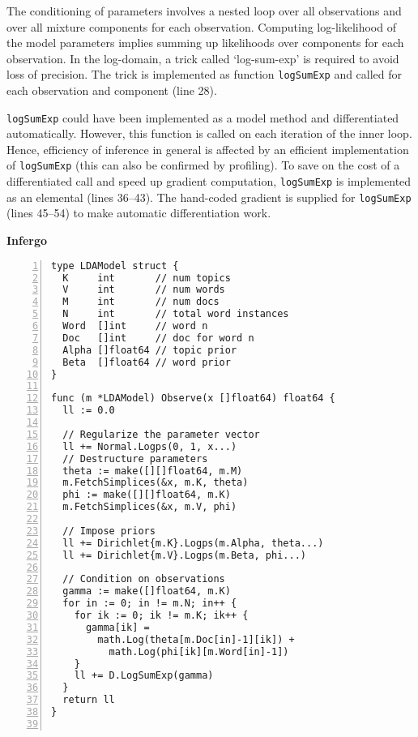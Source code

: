 \documentclass[sigplan,screen]{acmart}
\begin{document}
\begin{sloppypar}
The conditioning of parameters involves a nested loop over all
observations and over all mixture components for each
observation.  Computing log-likelihood of the model parameters
implies summing up likelihoods over components for each
observation.  In the log-domain, a trick called `log-sum-exp' is
required to avoid loss of precision. The trick is implemented
as function \lstinline{logSumExp} and called for each
observation and component (line 28).

\lstinline{logSumExp} could have been implemented as a model
method and differentiated automatically. However, this function
is called on each iteration of the inner loop. Hence,
efficiency of inference in general is affected by
an efficient implementation of \lstinline{logSumExp} (this can
also be confirmed by profiling). To save on the cost of a
differentiated call and speed up gradient computation,
\lstinline{logSumExp} is implemented as an elemental (lines
36--43). The hand-coded gradient is supplied for
\lstinline{logSumExp} (lines 45--54) to make automatic
differentiation work.

\begin{figure*}
\begin{minipage}[t]{0.49\textwidth}
\centering
\textbf{Infergo}

\begin{lstlisting}[xleftmargin=11pt,framexleftmargin=10pt,numbers=left]
type LDAModel struct {
  K     int       // num topics
  V     int       // num words
  M     int       // num docs
  N     int       // total word instances
  Word  []int     // word n
  Doc   []int     // doc for word n
  Alpha []float64 // topic prior
  Beta  []float64 // word prior
}

func (m *LDAModel) Observe(x []float64) float64 {
  ll := 0.0

  // Regularize the parameter vector
  ll += Normal.Logps(0, 1, x...)
  // Destructure parameters
  theta := make([][]float64, m.M)
  m.FetchSimplices(&x, m.K, theta)
  phi := make([][]float64, m.K)
  m.FetchSimplices(&x, m.V, phi)

  // Impose priors
  ll += Dirichlet{m.K}.Logps(m.Alpha, theta...)
  ll += Dirichlet{m.V}.Logps(m.Beta, phi...)

  // Condition on observations
  gamma := make([]float64, m.K)
  for in := 0; in != m.N; in++ {
    for ik := 0; ik != m.K; ik++ {
      gamma[ik] = 
        math.Log(theta[m.Doc[in]-1][ik]) +
          math.Log(phi[ik][m.Word[in]-1])
    }
    ll += D.LogSumExp(gamma)
  }
  return ll
}


\end{lstlisting}
\end{minipage}
\end{figure*}
\end{sloppypar}
\end{document}
